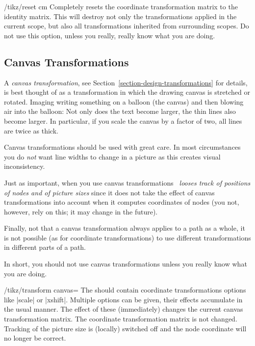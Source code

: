 \begin{key}{/tikz/reset cm}
  Completely resets the coordinate transformation matrix to the
  identity matrix. This will destroy not only the transformations
  applied in the current scope, but also all transformations inherited
  from surrounding scopes. Do not use this option, unless you really,
  really know what you are doing.
\end{key}




\subsection{Canvas Transformations}

A \emph{canvas transformation}, see
Section~\ref{section-design-transformations} for details, is best
thought of as a transformation in which the drawing canvas is
stretched or rotated. Imaging writing something on a balloon (the
canvas) and then blowing air into the balloon: Not only does the text
become larger, the thin lines also become larger. In particular, if
you scale the canvas by a factor of two, all lines are twice as
thick.

Canvas transformations should be used with great care. In most
circumstances you do \emph{not} want line widths to change in a
picture as this creates visual inconsistency.

Just as important, when
you use canvas transformations \emph{\pgfname\ looses track of
  positions of nodes and of picture sizes} since it does not take the
effect of canvas transformations into account when it computes
coordinates of nodes (you not, however, rely on this; it may change in
the future).

Finally, not that a canvas transformation always applies to a path as
a whole, it is not possible (as for coordinate transformations) to use
different transformations in different parts of a path.

In short, you should not use canvas transformations unless you really
know what you are doing.

\begin{key}{/tikz/transform canvas=}
  The  should contain coordinate transformations options
  like |scale| or |xshift|. Multiple options can be given, their
  effects accumulate in the usual manner. The effect of these
   (immediately) changes the current canvas
  transformation matrix. The coordinate transformation matrix is not
  changed. Tracking of the picture size is (locally) switched off and
  the node coordinate will no longer be correct.
\begin{codeexample}[]
\end{codeexample}
\end{key}
